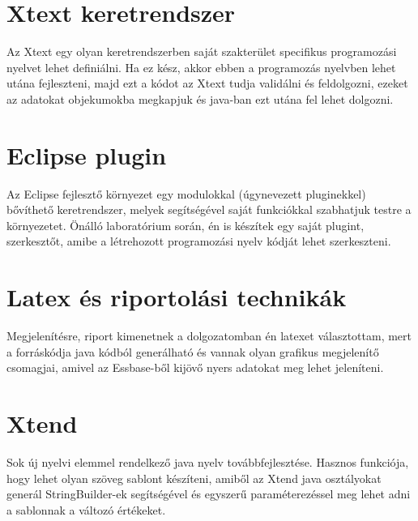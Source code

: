 \section{Xtext keretrendszer}
Az Xtext egy olyan keretrendszerben saját szakterület specifikus programozási nyelvet lehet definiálni. Ha ez kész, akkor ebben a programozás nyelvben lehet utána fejleszteni, majd ezt a kódot az Xtext tudja validálni és feldolgozni, ezeket az adatokat objekumokba megkapjuk és java-ban ezt utána fel lehet dolgozni.

\section{Eclipse plugin}
Az Eclipse fejlesztő környezet egy modulokkal (úgynevezett pluginekkel) bővíthető keretrendszer, melyek segítségével saját funkciókkal szabhatjuk testre a környezetet. Önálló laboratórium során, én is készítek egy saját plugint, szerkesztőt, amibe a létrehozott programozási nyelv kódját lehet szerkeszteni.

\section{Latex és riportolási technikák}
Megjelenítésre, riport kimenetnek a dolgozatomban én latexet választottam, mert a forráskódja java kódból generálható és vannak olyan grafikus megjelenítő csomagjai, amivel az Essbase-ből kijövő nyers adatokat meg lehet jeleníteni.

\section{Xtend}
Sok új nyelvi elemmel rendelkező java nyelv továbbfejlesztése. Hasznos funkciója, hogy lehet olyan szöveg sablont készíteni, amiből az Xtend java osztályokat generál StringBuilder-ek segítségével és egyszerű paraméterezéssel meg lehet adni a sablonnak a változó értékeket.

